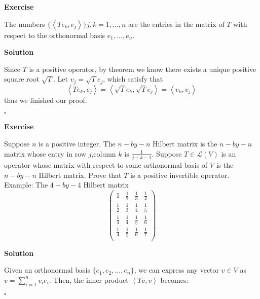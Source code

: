 \documentclass{article}
\newenvironment{exercise}{%
{\textbf{Exercise\\}
    }
}{
}
\newenvironment{solution}{%
{
    \textbf{Solution\\}
    }
}{
  \hfill $\square$ 
  \par\bigskip 
}
\begin{document}
\begin{CJK}{UTF8}{gkai}
\begin{exercise}
    The numbers $\{\left<Te_k,e_j\right>\}j,k=1,\ldots,n$ are the entries in the matrix of $T$ with respect to the orthonormal basis $e_1,\ldots,e_n$.

\end{exercise}

\begin{solution}
    Since $T$ is a positive operator, by theorem we know there exists a unique positive square root $\sqrt{T}$. Let $v_j = \sqrt{T} e_j$, which satisfy that 
    \[\left<Te_k,e_j\right> = \left<\sqrt{T}e_k,\sqrt{T}e_j\right> = \left<v_k,v_j\right>\]
    thus we finished our proof.
\end{solution}

\begin{exercise}
    Suppose $n$ is a positive integer. The $n-by-n$ Hilbert matrix is the $n-by-n$ matrix whose entry in row $j$,column $k$ is $\frac{1}{j + k - 1}$. Suppose $T\in\mathcal{L}(V)$ is an operator whose matrix with respect to some orthonormal basis of $V$ is the $n-by-n$ Hilbert matrix. Prove that $T$ is a positive invertible operator.\\

    Example: The $4-by-4$ Hilbert matrix
    \[\begin{pmatrix}
        1 & \frac{1}{2}&\frac{1}{3}&\frac{1}{4}\\
        \frac{1}{2} & \frac{1}{3}&\frac{1}{4}&\frac{1}{5}\\
        \frac{1}{3} & \frac{1}{4}&\frac{1}{5}&\frac{1}{6}\\
        \frac{1}{4} & \frac{1}{5}&\frac{1}{6}&\frac{1}{7}\\
    \end{pmatrix}\]
\end{exercise}

\begin{solution}
    Given an orthonormal basis $\{e_1, e_2, \ldots, e_n\}$, we can express any vector $v \in V$ as $v = \sum_{i=1}^{n} v_i e_i$. Then, the inner product $\left< Tv, v \right>$ becomes:
    

\end{solution}
\end{CJK}
\end{document}
